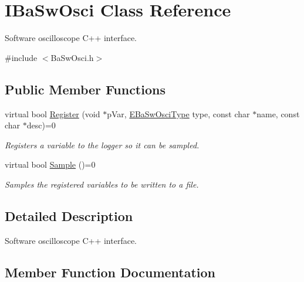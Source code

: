 \hypertarget{classIBaSwOsci}{}\section{I\+Ba\+Sw\+Osci Class Reference}
\label{classIBaSwOsci}


Software oscilloscope C++ interface.  




{\ttfamily \#include $<$Ba\+Sw\+Osci.\+h$>$}

\subsection*{Public Member Functions}
\begin{DoxyCompactItemize}
\item 
virtual bool \hyperlink{classIBaSwOsci_ac04ce939f45bd7c9cc7270c9dcb3c02d}{Register} (void $\ast$p\+Var, \hyperlink{BaSwOsci_8h_abf69cee9886990d98598cd2abcf3ebfc}{E\+Ba\+Sw\+Osci\+Type} type, const char $\ast$name, const char $\ast$desc)=0
\begin{DoxyCompactList}\small\item\em Registers a variable to the logger so it can be sampled. \end{DoxyCompactList}\item 
virtual bool \hyperlink{classIBaSwOsci_a72219859525f1c1af136d1a8081bb1a7}{Sample} ()=0
\begin{DoxyCompactList}\small\item\em Samples the registered variables to be written to a file. \end{DoxyCompactList}\end{DoxyCompactItemize}


\subsection{Detailed Description}
Software oscilloscope C++ interface. 

\subsection{Member Function Documentation}
\hypertarget{classIBaSwOsci_ac04ce939f45bd7c9cc7270c9dcb3c02d}{}

